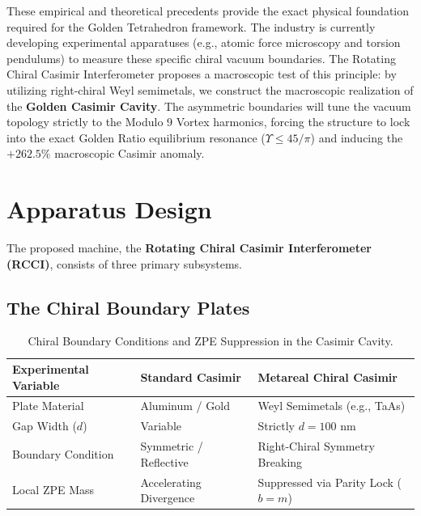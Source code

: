 These empirical and theoretical precedents provide the exact physical foundation required for the Golden Tetrahedron framework. The industry is currently developing experimental apparatuses (e.g., atomic force microscopy and torsion pendulums) to measure these specific chiral vacuum boundaries. The Rotating Chiral Casimir Interferometer proposes a macroscopic test of this principle: by utilizing right-chiral Weyl semimetals, we construct the macroscopic realization of the \textbf{Golden Casimir Cavity}. The asymmetric boundaries will tune the vacuum topology strictly to the Modulo 9 Vortex harmonics, forcing the structure to lock into the exact Golden Ratio equilibrium resonance ($\Upsilon \le 45/\pi$) and inducing the $+262.5\%$ macroscopic Casimir anomaly.

\section{Apparatus Design}\label{sec:design}

The proposed machine, the \textbf{Rotating Chiral Casimir Interferometer (RCCI)}, consists of three primary subsystems.

\subsection{The Chiral Boundary Plates}\label{sec:plates}

\begin{table}[ht]
\centering
\begin{tabular}{|l|l|l|}
\hline
\textbf{Experimental Variable} & \textbf{Standard Casimir} & \textbf{Metareal Chiral Casimir} \\
\hline
Plate Material & Aluminum / Gold & Weyl Semimetals (e.g., TaAs) \\
Gap Width ($d$) & Variable & Strictly $d = 100$ nm \\
Boundary Condition & Symmetric / Reflective & Right-Chiral Symmetry Breaking \\
Local ZPE Mass & Accelerating Divergence & Suppressed via Parity Lock ($b=m$) \\
\hline
\end{tabular}
\caption{Chiral Boundary Conditions and ZPE Suppression in the Casimir Cavity.}
\label{tab:chiral_casimir}
\end{table}

